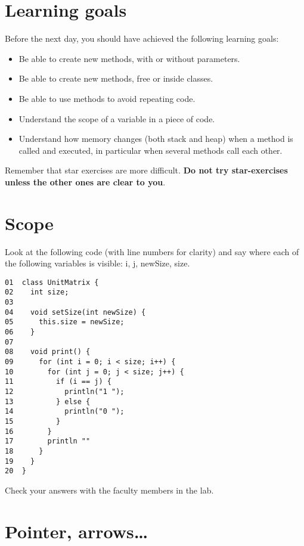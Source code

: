 \documentclass{article}
\begin{document}
\section*{Learning goals}
\label{sec:learning-goals}

Before the next day, you should have achieved the following learning
goals: 

\begin{itemize}
\item Be able to create new methods, with or without parameters.
\item Be able to create new methods, free or inside classes.
\item Be able to use methods to avoid repeating code.
\item Understand the scope of a variable in a piece of code. 
\item Understand how memory changes (both stack and heap) when a
  method is called and executed, in particular when several methods
  call each other. 
\end{itemize}

Remember that star exercises are more difficult. 
\textbf{Do not try star-exercises unless the other ones are clear to
  you}.  



\section{Scope}
\label{sec:scope}

Look at the following code  (with line numbers for clarity) and say
where each of the following  
variables is visible: i, j, newSize, size. 

\begin{verbatim}
01  class UnitMatrix {
02    int size;
03  
04    void setSize(int newSize) {
05      this.size = newSize;
06    }
07    
08    void print() {
09      for (int i = 0; i < size; i++) {
10        for (int j = 0; j < size; j++) {
11          if (i == j) {
12            println("1 ");
13          } else {
14            println("0 ");
15          }
16        }
17        println ""
18      }
19    }
20  }
\end{verbatim}

Check your answers with the faculty members in the lab. 

\section{Pointer, arrows\ldots}
\label{sec:pointer-arrowsldots}
\end{document}

